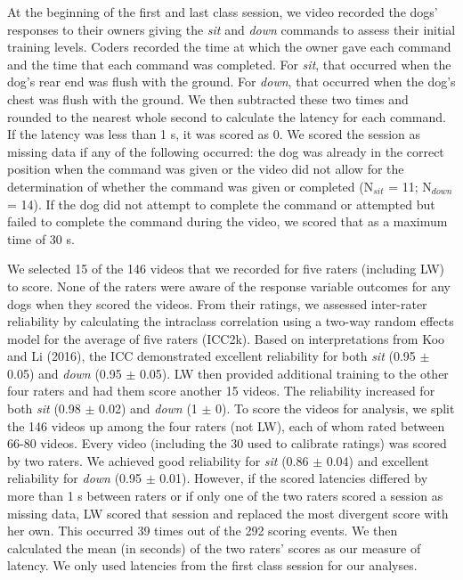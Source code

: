 \documentclass[
  english,
  ,pub,floatsintext]{apa6}
\begin{document}
At the beginning of the first and last class session, we video recorded the dogs' responses to their owners giving the \emph{sit} and \emph{down} commands to assess their initial training levels. Coders recorded the time at which the owner gave each command and the time that each command was completed. For \emph{sit}, that occurred when the dog's rear end was flush with the ground. For \emph{down}, that occurred when the dog's chest was flush with the ground. We then subtracted these two times and rounded to the nearest whole second to calculate the latency for each command. If the latency was less than 1 s, it was scored as 0. We scored the session as missing data if any of the following occurred: the dog was already in the correct position when the command was given or the video did not allow for the determination of whether the command was given or completed (N\(_{sit}\) = 11; N\(_{down}\) = 14). If the dog did not attempt to complete the command or attempted but failed to complete the command during the video, we scored that as a maximum time of 30 s.

We selected 15 of the 146 videos that we recorded for five raters (including LW) to score. None of the raters were aware of the response variable outcomes for any dogs when they scored the videos. From their ratings, we assessed inter-rater reliability by calculating the intraclass correlation using a two-way random effects model for the average of five raters (ICC2k). Based on interpretations from Koo and Li (2016), the ICC demonstrated excellent reliability for both \emph{sit} (0.95 \(\pm\) 0.05) and \emph{down} (0.95 \(\pm\) 0.05). LW then provided additional training to the other four raters and had them score another 15 videos. The reliability increased for both \emph{sit} (0.98 \(\pm\) 0.02) and \emph{down} (1 \(\pm\) 0). To score the videos for analysis, we split the 146 videos up among the four raters (not LW), each of whom rated between 66-80 videos. Every video (including the 30 used to calibrate ratings) was scored by two raters. We achieved good reliability for \emph{sit} (0.86 \(\pm\) 0.04) and excellent reliability for \emph{down} (0.95 \(\pm\) 0.01). However, if the scored latencies differed by more than 1 s between raters or if only one of the two raters scored a session as missing data, LW scored that session and replaced the most divergent score with her own. This occurred 39 times out of the 292 scoring events. We then calculated the mean (in seconds) of the two raters' scores as our measure of latency. We only used latencies from the first class session for our analyses.
\end{document}
